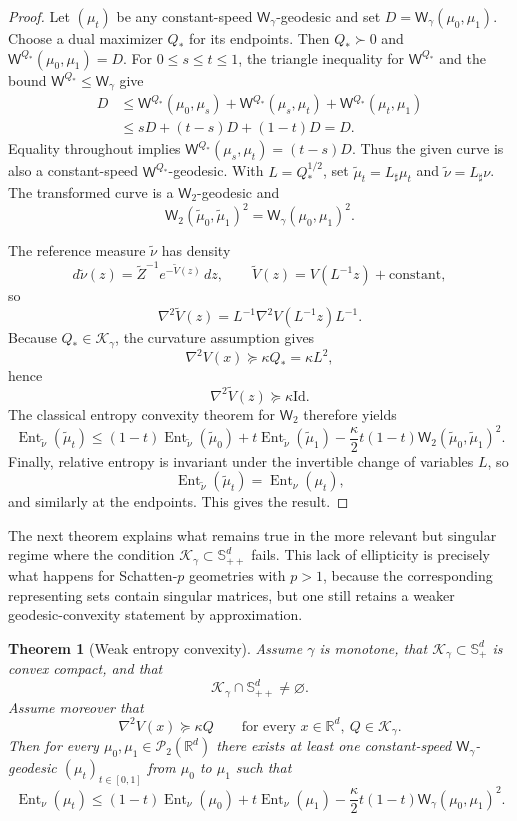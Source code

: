 \documentclass{article}
\newtheorem{theorem}{Theorem}[section]
\newcommand{\R}{\mathbb{R}}
\newcommand{\cP}{\mathcal{P}}
\newcommand{\Wtwo}{\mathsf{W}_2}
\newcommand{\Wg}{\mathsf{W}_{\gamma}}
\newcommand{\WQ}[1]{\mathsf{W}^{#1}}
\newcommand{\Id}{\mathrm{Id}}
\newcommand{\cK}{\mathcal K_\gamma}
\newcommand{\Sppd}{\mathbb S_{++}^d}
\begin{document}
\begin{proof}
Let $(\mu_t)$ be any constant-speed $\Wg$-geodesic and set
$D=\Wg(\mu_0,\mu_1)$. Choose a dual maximizer $Q_*$ for its endpoints.
Then $Q_*\succ0$ and $\WQ{Q_*}(\mu_0,\mu_1)=D$. For $0\le s\le t\le1$,
the triangle inequality for $\WQ{Q_*}$ and the bound $\WQ{Q_*}\le\Wg$ give
\[
\begin{aligned}
 D&\le \WQ{Q_*}(\mu_0,\mu_s)+\WQ{Q_*}(\mu_s,\mu_t)
       +\WQ{Q_*}(\mu_t,\mu_1)\\
  &\le sD+(t-s)D+(1-t)D=D.
\end{aligned}
\]
Equality throughout implies $\WQ{Q_*}(\mu_s,\mu_t)=(t-s)D$.
Thus the given curve is also a constant-speed $\WQ{Q_*}$-geodesic.
With $L=Q_*^{1/2}$, set $\widetilde\mu_t=L_\sharp\mu_t$ and
$\widetilde\nu=L_\sharp\nu$. The transformed curve is a $\Wtwo$-geodesic and
$$
\Wtwo(\widetilde\mu_0,\widetilde\mu_1)^2=\Wg(\mu_0,\mu_1)^2.
$$

The reference measure $\widetilde\nu$ has density
$$
d\widetilde\nu(z)=\widetilde Z^{-1}e^{-\widetilde V(z)}\,dz,
\qquad
\widetilde V(z)=V(L^{-1}z)+\text{constant},
$$
so
$$
\nabla^2\widetilde V(z)=L^{-1}\nabla^2V(L^{-1}z)L^{-1}.
$$
Because $Q_*\in\cK$, the curvature assumption gives
$$
\nabla^2V(x)\succeq \kappa Q_*=\kappa L^2,
$$
hence
$$
\nabla^2\widetilde V(z)\succeq \kappa \Id.
$$
The classical entropy convexity theorem for $\Wtwo$ therefore yields
$$
\operatorname{Ent}_{\widetilde\nu}(\widetilde\mu_t)
\le
(1-t)\operatorname{Ent}_{\widetilde\nu}(\widetilde\mu_0)
+t\operatorname{Ent}_{\widetilde\nu}(\widetilde\mu_1)
-\frac{\kappa}{2}t(1-t)\Wtwo(\widetilde\mu_0,\widetilde\mu_1)^2.
$$
Finally, relative entropy is invariant under the invertible change of variables $L$, so
$$
\operatorname{Ent}_{\widetilde\nu}(\widetilde\mu_t)=\operatorname{Ent}_\nu(\mu_t),
$$
and similarly at the endpoints. This gives the result.
\end{proof}

The next theorem explains what remains true in the more relevant but singular regime where the condition $\cK\subset \Sppd$ fails. This lack of ellipticity is precisely what happens for Schatten-$p$ geometries with $p>1$, because the corresponding representing sets contain singular matrices, but one still retains a weaker geodesic-convexity statement by approximation.
\begin{theorem}[Weak entropy convexity]
\label{thm:entropyweak}
Assume $\gamma$ is monotone, that $\cK\subset \mathbb S_+^d$ is convex compact, and that
$$
\cK\cap \Sppd\neq \varnothing.
$$
Assume moreover that
$$
\nabla^2V(x)\succeq \kappa Q
\qquad
\text{for every }x\in\R^d,\ Q\in\cK.
$$
Then for every $\mu_0,\mu_1\in\cP_2(\R^d)$ there exists at least one constant-speed $\Wg$-geodesic $(\mu_t)_{t\in[0,1]}$ from $\mu_0$ to $\mu_1$ such that
$$
\operatorname{Ent}_\nu(\mu_t)
\le
(1-t)\operatorname{Ent}_\nu(\mu_0)+t\operatorname{Ent}_\nu(\mu_1)
-\frac{\kappa}{2}t(1-t)\Wg(\mu_0,\mu_1)^2.
$$
\end{theorem}
\end{document}
